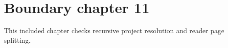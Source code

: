 \section{Boundary chapter 11}
\label{sec:boundary-11}
This included chapter checks recursive project resolution and reader page splitting.
